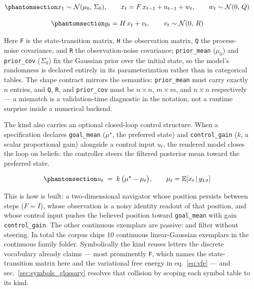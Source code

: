 \documentclass[
  english,
  9pt,
]{extarticle}
\begin{document}
\begin{equation}\protect\phantomsection\label{eq:lgssm_state}{x_1 \sim \mathcal{N}(\mu_0,\, \Sigma_0), \qquad x_t = F\, x_{t-1} + u_{t-1} + w_t, \qquad w_t \sim \mathcal{N}(0,\, Q)}\end{equation}

\begin{equation}\protect\phantomsection\label{eq:lgssm_obs}{y_t = H\, x_t + v_t, \qquad v_t \sim \mathcal{N}(0,\, R)}\end{equation}

Here \texttt{F} is the state-transition matrix, \texttt{H} the
observation matrix, \texttt{Q} the process-noise covariance, and
\texttt{R} the observation-noise covariance; \texttt{prior\_mean}
(\(\mu_0\)) and \texttt{prior\_cov} (\(\Sigma_0\)) fix the Gaussian
prior over the initial state, so the model's randomness is declared
entirely in its parameterization rather than in categorical tables. The
shape contract mirrors the semantics: \texttt{prior\_mean} must carry
exactly \(n\) entries, and \texttt{Q}, \texttt{R}, and
\texttt{prior\_cov} must be \(n \times n\), \(m \times m\), and
\(n \times n\) respectively --- a mismatch is a validation-time
diagnostic in the notation, not a runtime surprise inside a numerical
backend.

The kind also carries an optional closed-loop control structure. When a
specification declares \texttt{goal\_mean} (\(\mu^\star\), the preferred
state) and \texttt{control\_gain} (\(k\), a scalar proportional gain)
alongside a control input \(u_t\), the rendered model closes the loop on
beliefs: the controller steers the filtered posterior mean toward the
preferred state.

\begin{equation}\protect\phantomsection\label{eq:closed_loop}{u_t \;=\; k \,\bigl(\mu^\star - \mu_t\bigr), \qquad \mu_t = \mathbb{E}\!\left[x_t \,\middle|\, y_{1:t}\right]}\end{equation}

This is how
 is built:
a two-dimensional navigator whose position persists between steps
(\(F = I\)), whose observation is a noisy identity readout of that
position, and whose control input pushes the believed position toward
\texttt{goal\_mean} with gain \texttt{control\_gain}. The other
continuous exemplars are passive: 
and  filter without steering. In total
the corpus ships 10 continuous linear-Gaussian exemplars in the
continuous family folder. Symbolically the kind reuses letters the
discrete vocabulary already claims --- most prominently \texttt{F},
which names the state-transition matrix here and the variational free
energy in eq.~\ref{eq:vfe} --- and sec.~\ref{sec:symbols_glossary}
resolves that collision by scoping each symbol table to its kind.
\end{document}
